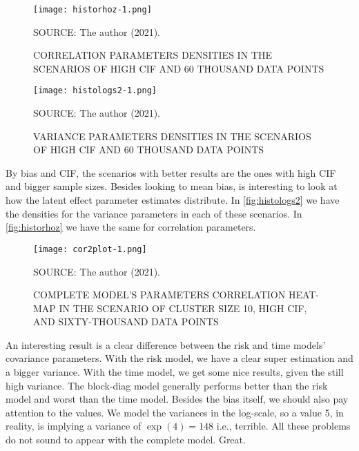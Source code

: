 \begin{figure}[H]
 \setlength{\abovecaptionskip}{.0001pt}
 \caption{CORRELATION PARAMETERS DENSITIES IN THE SCENARIOS OF HIGH CIF
          AND 60 THOUSAND DATA POINTS}
 \vspace{0.2cm}\centering
 \texttt{[image: historhoz-1.png]}\\
 \begin{footnotesize}
  SOURCE: The author (2021).
 \end{footnotesize}
 \label{fig:historhoz}
\end{figure}

\begin{figure}[H]
 \setlength{\abovecaptionskip}{.0001pt}
 \caption{VARIANCE PARAMETERS DENSITIES IN THE SCENARIOS OF HIGH CIF AND
          60 THOUSAND DATA POINTS}
 \vspace{0.2cm}\centering
 \texttt{[image: histologs2-1.png]}\\
 \begin{footnotesize}
  SOURCE: The author (2021).
 \end{footnotesize}
 \label{fig:histologs2}
\end{figure}

By bias and CIF, the scenarios with better results are the ones with
high CIF and bigger sample sizes. Besides looking to mean bias, is
interesting to look at how the latent effect parameter estimates
distribute. In \autoref{fig:histologs2} we have the densities for the
variance parameters in each of these scenarios. In
\autoref{fig:historhoz} we have the same for correlation parameters.

\begin{figure}[H]
 \setlength{\abovecaptionskip}{.0001pt}
 \caption{COMPLETE MODEL'S PARAMETERS CORRELATION HEAT-MAP IN THE
          SCENARIO OF CLUSTER SIZE 10, HIGH CIF, AND SIXTY-THOUSAND DATA
          POINTS}
 \centering
 \texttt{[image: cor2plot-1.png]}\\
 \vspace{-0.2cm}
 \begin{footnotesize}
  SOURCE: The author (2021).
 \end{footnotesize}
 \label{fig:cor2plot}
\end{figure}

An interesting result is a clear difference between the risk and time
models' covariance parameters. With the risk model, we have a clear
super estimation and a bigger variance. With the time model, we get some
nice results, given the still high variance. The block-diag model
generally performs better than the risk model and worst than the time
model. Besides the bias itself, we should also pay attention to the
values. We model the variances in the log-scale, so a value 5, in
reality, is implying a variance of \(\exp(4) = 148\) i.e., terrible. All
these problems do not sound to appear with the complete model. Great.

